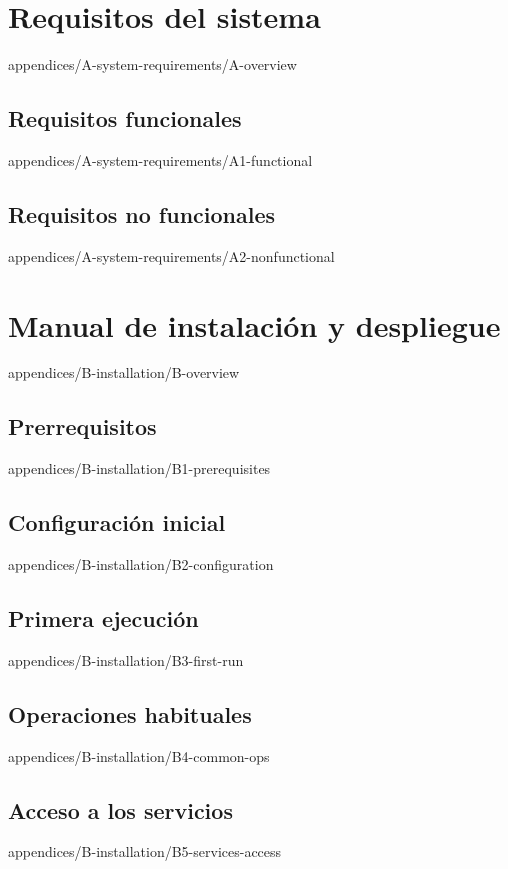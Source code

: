 \documentclass[epsbased,tfg,covers,final,printable,extendedindex,%
               firstnumbered,lof,lot, loc]{tfgtfmthesisuam}
\begin{document}
\appendix

\chapter{Requisitos del sistema\label{AP:REQUIREMENTS}}%
        {appendices/A-system-requirements/A-overview}
  \section{Requisitos funcionales\label{SEC:REQ-FUNCTIONAL}}%
          {appendices/A-system-requirements/A1-functional}
  \section{Requisitos no funcionales\label{SEC:REQ-NONFUNCTIONAL}}%
          {appendices/A-system-requirements/A2-nonfunctional}

\chapter{Manual de instalación y despliegue\label{AP:INSTALLATION}}%
        {appendices/B-installation/B-overview}
  \section{Prerrequisitos\label{SEC:INSTALL-PRE}}%
          {appendices/B-installation/B1-prerequisites}
  \section{Configuración inicial\label{SEC:INSTALL-CONFIG}}%
          {appendices/B-installation/B2-configuration}
  \section{Primera ejecución\label{SEC:INSTALL-FIRST-RUN}}%
          {appendices/B-installation/B3-first-run}
  \section{Operaciones habituales\label{SEC:INSTALL-OPS}}%
          {appendices/B-installation/B4-common-ops}
  \section{Acceso a los servicios\label{SEC:INSTALL-SERVICES}}%
          {appendices/B-installation/B5-services-access}
\end{document}

